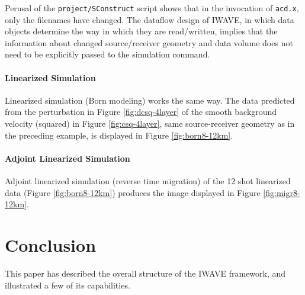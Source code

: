 {Perusal of the {\tt project/SConstruct} script shows that in the
invocation of {\tt acd.x}, only the filenames have changed. The
dataflow design of IWAVE, in which data objects determine the way in
which they are read/written, implies that the information about
changed source/receiver geometry and data volume does not need to be
explicitly passed to the simulation command.

\noindent \paragraph{Linearized Simulation}
Linearized simulation (Born modeling) works the same way. The data
predicted from the perturbation in Figure \ref{fig:dcsq-4layer} of the smooth
background velocity (squared) in Figure \ref{fig:csq-4layer}, same
source-receiver geometry as in the preceding example, is displayed in
Figure \ref{fig:born8-12km}.


\noindent \paragraph{Adjoint Linearized Simulation}
Adjoint linearized simulation (reverse time migration) of the 12 shot
linearized data (Figure \ref{fig:born8-12km}) produces the image
displayed in Figure \ref{fig:migr8-12km}. 


\section{Conclusion}
This paper has described the overall structure of the IWAVE framework,
and illustrated a few of its capabilities. 

}
